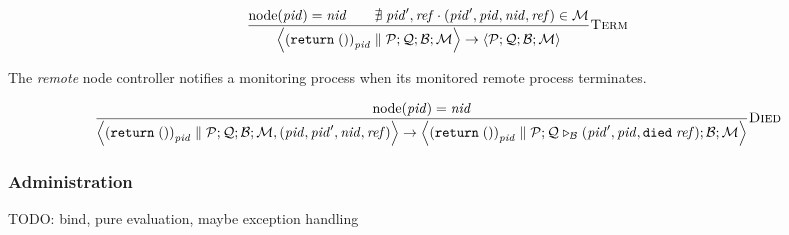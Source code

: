 \documentclass{article}
\newcommand{\sReturn}{\mathtt{return}}
\DeclareMathOperator{\sNodeOf}{node}
\newcommand{\sExtend}[1]{\mathrel{\triangleright_{#1}}}
\newcommand{\sPar}{\mathrel{\parallel}}
\newcommand{\sNid}{\ensuremath{\mathit{nid}}}
\newcommand{\sPid}{\ensuremath{\mathit{pid}}}
\newcommand{\sRef}{\ensuremath{\mathit{ref}}}
\newcommand{\sSystem}[4]{\left\langle #1 ; #2 ; #3 ; #4 \right\rangle}
\newcommand{\sQueue}{\mathcal{Q}}
\newcommand{\sProcesses}{\mathcal{P}}
\newcommand{\sBlacklist}{\mathcal{B}}
\newcommand{\sMonitors}{\mathcal{M}}
\begin{document}
\begin{equation*}
\frac{
  \sNodeOf(\sPid) = \sNid
\qquad
  \nexists \; \sPid', \sRef \cdot (\sPid', \sPid, \sNid, \sRef) \in \sMonitors 
}{
  \sSystem{{(\sReturn \; ())}_\sPid \sPar \sProcesses}
          {\sQueue}
          {\sBlacklist}
          {\sMonitors}
\rightarrow          
  \sSystem{\sProcesses}
          {\sQueue}
          {\sBlacklist}
          {\sMonitors}
} \textsc{Term}
\end{equation*}

The \emph{remote} node controller notifies a monitoring process when its
monitored remote process terminates.

\begin{equation*}
\frac{
  \sNodeOf(\sPid) = \sNid
}{
  \sSystem{{(\sReturn \; ())}_\sPid \sPar \sProcesses}
          {\sQueue}
          {\sBlacklist}
          {\sMonitors, (\sPid, \sPid', \sNid, \sRef)}
\rightarrow
  \sSystem{{(\sReturn \; ())}_\sPid \sPar \sProcesses}
          {\sQueue \sExtend{\sBlacklist} (\sPid', \sPid, \mathtt{died} \; \sRef)}
          {\sBlacklist}
          {\sMonitors}
} \textsc{Died}
\end{equation*}

\subsubsection{Administration}

TODO: bind, pure evaluation, maybe exception handling
\end{document}
